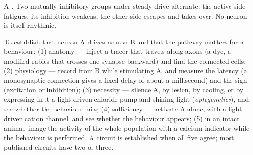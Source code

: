 \begin{omfigure}

{\small A . Two mutually inhibitory groups under
steady drive alternate: the active side fatigues, its inhibition
weakens, the other side escapes and takes over. No neuron is itself
rhythmic.}
\end{omfigure}

\begin{method}\label{met:b3:nervous-systems:tracing}
To establish that neuron A drives neuron B and that the pathway
matters for a behaviour: (1) anatomy --- inject a tracer that travels
along axons (a dye, a modified rabies  that crosses one synapse
backward) and find the connected cells; (2) physiology --- record from B
while stimulating A, and measure the latency (a monosynaptic connection
gives a fixed delay of about a millisecond) and the sign (excitation or
inhibition); (3) necessity --- silence A, by lesion, by cooling, or by
expressing in it a light-driven chloride pump and shining light
(\emph{optogenetics}), and see whether the behaviour fails; (4)
sufficiency --- activate A alone, with a light-driven cation channel,
and see whether the behaviour appears; (5) in an intact animal, image
the activity of the whole population with a calcium indicator while
the behaviour is performed. A circuit is established when all five
agree; most published circuits have two or three.
\end{method}

